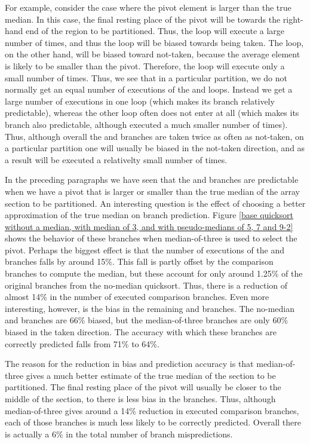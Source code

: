 For example, consider the case where the pivot element is larger than the true
median. In this case, the final resting place of the pivot will be towards the
right-hand end of the region to be partitioned. Thus, the  loop will
execute a large number of times, and thus the  loop will be biased towards
being taken. The  loop, on the other hand, will be biased toward not-taken,
because the average element is likely to be smaller than the pivot.  Therefore,
the  loop will execute only a small number of times. Thus, we see that in a
particular partition, we do not normally get an equal number of executions of
the  and  loops. Instead we get a large number of executions in one
loop (which makes its branch relatively predictable), whereas the other loop
often does not enter at all (which makes its branch also predictable, although
executed a much smaller number of times). Thus, although overall the  and
 branches are taken twice as often as not-taken, on a particular partition
one will usually be biased in the not-taken direction, and as a result will be
executed a relativelty small number of times.

In the preceding paragraphs we have seen that the  and  branches are
predictable when we have a pivot that is larger or smaller than the true median
of the array section to be partitioned. An interesting question is the effect of
choosing a better approximation of the true median on branch prediction. Figure
\ref{base quicksort without a median, with median of 3, and with pseudo-medians
of 5, 7 and 9-2} shows the behavior of these branches when median-of-three is
used to select the pivot. Perhaps the biggest effect is that the number of
executions of the  and  branches falls by around 15\%. This fall is
partly offset by the comparison branches to compute the median, but these
account for only around 1.25\% of the original branches from the no-median
quicksort. Thus, there is a reduction of almost 14\% in the number of executed
comparison branches. Even more interesting, however, is the bias in the
remaining  and  branches. The no-median  and  branches are
66\% biased, but the median-of-three branches are only 60\% biased in the taken
direction. The accuracy with which these branches are correctly predicted falls
from 71\% to 64\%.

The reason for the reduction in bias and prediction accuracy is that
median-of-three gives a much better estimate of the true median of the section
to be partitioned. The final resting place of the pivot will usually be closer
to the middle of the section, to there is less bias in the branches. Thus,
although median-of-three gives around a 14\% reduction in executed comparison
branches, each of those branches is much less likely to be correctly predicted.
Overall there is actually a 6\%  in the total number of branch
mispredictions.

